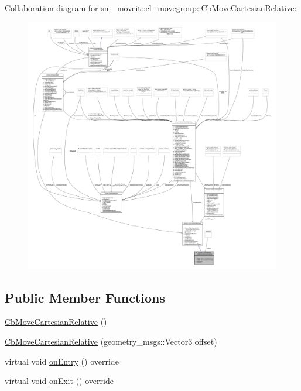 Collaboration diagram for sm\+\_\+moveit\+:\+:cl\+\_\+movegroup\+:\+:Cb\+Move\+Cartesian\+Relative\+:
\nopagebreak
\begin{figure}[H]
\begin{center}
\leavevmode
\includegraphics[width=350pt]{classsm__moveit_1_1cl__movegroup_1_1CbMoveCartesianRelative__coll__graph}
\end{center}
\end{figure}
\subsection*{Public Member Functions}
\begin{DoxyCompactItemize}
\item 
\hyperlink{classsm__moveit_1_1cl__movegroup_1_1CbMoveCartesianRelative_a0f2947c4d3b9a1a3e43031e0d3d55e1f}{Cb\+Move\+Cartesian\+Relative} ()
\item 
\hyperlink{classsm__moveit_1_1cl__movegroup_1_1CbMoveCartesianRelative_a750939f120f462a0af55415007cf656a}{Cb\+Move\+Cartesian\+Relative} (geometry\+\_\+msgs\+::\+Vector3 offset)
\item 
virtual void \hyperlink{classsm__moveit_1_1cl__movegroup_1_1CbMoveCartesianRelative_ad28332aaa1952bc1e359c79aa961108e}{on\+Entry} () override
\item 
virtual void \hyperlink{classsm__moveit_1_1cl__movegroup_1_1CbMoveCartesianRelative_a2ef22fcd4fd348d8dbee9560c5edb790}{on\+Exit} () override
\end{DoxyCompactItemize}

